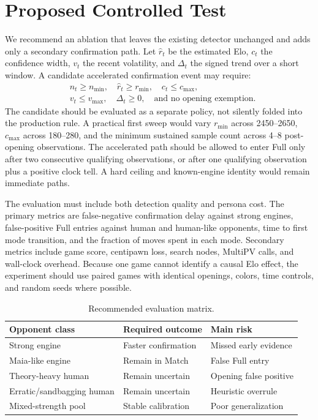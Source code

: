 \documentclass[conference]{IEEEtran}
\begin{document}
\section{Proposed Controlled Test}
We recommend an ablation that leaves the existing detector unchanged and adds only a secondary confirmation path. Let $\hat{r}_t$ be the estimated Elo, $c_t$ the confidence width, $v_t$ the recent volatility, and $\Delta_t$ the signed trend over a short window. A candidate accelerated confirmation event may require:
\begin{equation}
\begin{split}
  &n_t\geq n_{\min},\quad \hat{r}_t\geq r_{\min},\quad c_t\leq c_{\max},\\
  &v_t\leq v_{\max},\quad \Delta_t\geq0,\quad \text{and no opening exemption}.
\end{split}
\end{equation}
The candidate should be evaluated as a separate policy, not silently folded into the production rule. A practical first sweep would vary $r_{\min}$ across 2450--2650, $c_{\max}$ across 180--280, and the minimum sustained sample count across 4--8 post-opening observations. The accelerated path should be allowed to enter Full only after two consecutive qualifying observations, or after one qualifying observation plus a positive clock tell. A hard ceiling and known-engine identity would remain immediate paths.

The evaluation must include both detection quality and persona cost. The primary metrics are false-negative confirmation delay against strong engines, false-positive Full entries against human and human-like opponents, time to first mode transition, and the fraction of moves spent in each mode. Secondary metrics include game score, centipawn loss, search nodes, MultiPV calls, and wall-clock overhead. Because one game cannot identify a causal Elo effect, the experiment should use paired games with identical openings, colors, time controls, and random seeds where possible.

\begin{table}[t]
\caption{Recommended evaluation matrix.}
\label{tab:matrix}
\centering
\scriptsize
\begin{tabular}{@{}lll@{}}
\toprule
Opponent class & Required outcome & Main risk \\
\midrule
Strong engine & Faster confirmation & Missed early evidence \\
Maia-like engine & Remain in Match & False Full entry \\
Theory-heavy human & Remain uncertain & Opening false positive \\
Erratic/sandbagging human & Remain uncertain & Heuristic overrule \\
Mixed-strength pool & Stable calibration & Poor generalization \\
\bottomrule
\end{tabular}
\end{table}
\end{document}
